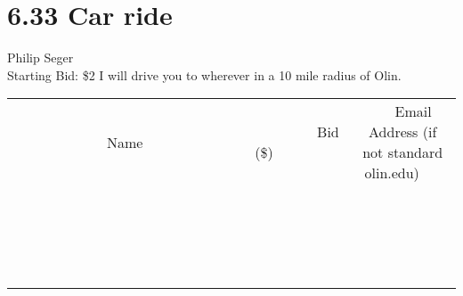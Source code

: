 \documentclass[11pt]{article}
\begin{document}
\section*{6.33 Car ride}
Philip Seger
\\
Starting Bid: \$2
\newline
I will drive you to wherever in a 10 mile radius of Olin.
\\[3ex]
\begin{tabular}{c c c}
~~~~~~~~~~~~~Name~~~~~~~~~~~~~ & ~~~~~~~~~Bid (\$)~~~~~~~~~  & ~~~Email Address (if not standard olin.edu)~~~\\
 & & \\
\hline
 & & \\
\hline
 & & \\
\hline
 & & \\
\hline
 & & \\
\hline
 & & \\
\hline
 & & \\
\hline
 & & \\
\hline
 & & \\
\hline
 & & \\
\hline
 & & \\
\hline
 & & \\
\hline
 & & \\
\hline
 & & \\
\hline
 & & \\
\hline
 & & \\
\hline
 & & \\
\hline
 & & \\
\hline
 & & \\
\hline
\end{tabular}
\newpage
\end{document}
